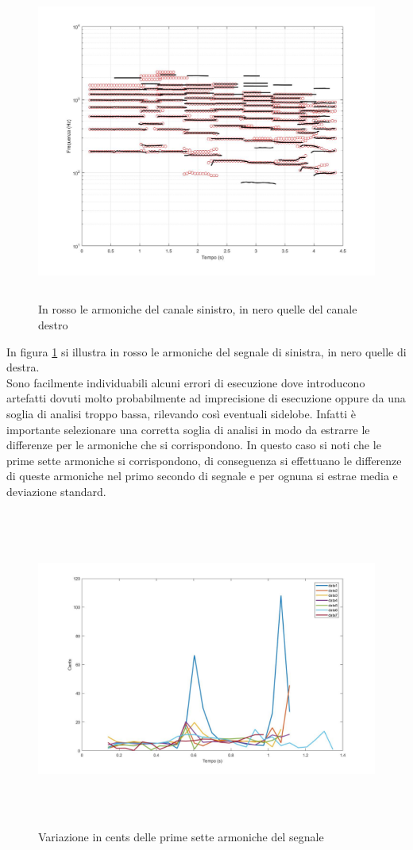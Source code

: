 \documentclass[12pt]{report}
\begin{document}
\begin{figure}[htbp]
\centerline{\includegraphics[height=105mm]{img/track}}
\caption{In rosso le armoniche del canale sinistro, in nero quelle del canale destro}
\label{fig:track}
\end{figure}

\clearpage

In figura \ref{fig:track} si illustra in rosso le armoniche del segnale di sinistra, in nero quelle di destra.\\
Sono facilmente individuabili alcuni errori di esecuzione dove introducono artefatti dovuti molto probabilmente ad imprecisione di esecuzione oppure da una soglia di analisi troppo bassa, rilevando così eventuali sidelobe. Infatti è importante selezionare una corretta soglia di analisi in modo da estrarre le differenze per le armoniche che si corrispondono. In questo caso si noti che le prime sette armoniche si corrispondono, di conseguenza si effettuano le differenze di queste armoniche nel primo secondo di segnale e per ognuna  si estrae media e deviazione standard.

\begin{figure}[htbp]
\centerline{\includegraphics[height=105mm]{img/diff_harm}}
\caption{Variazione in cents delle prime sette armoniche del segnale}
\label{fig:diff_harm}
\end{figure}
\end{document}
